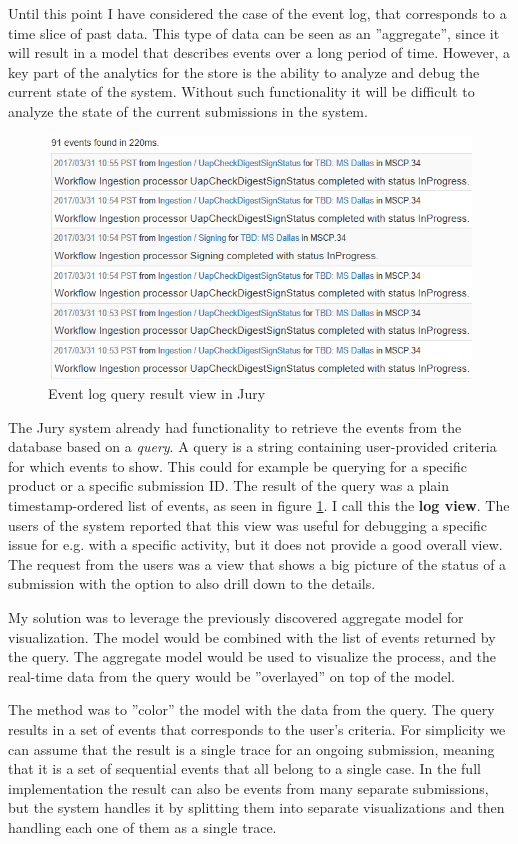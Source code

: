 \documentclass[english,12pt,a4paper,pdftex,sci,utf8]{aaltothesis}
\theoremstyle{definition}
\begin{document}
Until this point I have considered the case of the event log, that corresponds to a time slice of past data.
This type of data can be seen as an ''aggregate'', since it will result in a model that describes events over a long period of time.
However, a key part of the analytics for the store is the ability to analyze and debug the current state of the system.
Without such functionality it will be difficult to analyze the state of the current submissions in the system.

\begin{figure}[htb]
    \centering \includegraphics[width=0.7\linewidth]{gfx/plaineventlog.png}
    \caption{Event log query result view in Jury}
    \label{fig:plaineventlog}
\end{figure}

The Jury system already had functionality to retrieve the events from the database based on a \emph{query}.
A query is a string containing user-provided criteria for which events to show.
This could for example be querying for a specific product or a specific submission ID.
The result of the query was a plain timestamp-ordered list of events, as seen in figure \ref{fig:plaineventlog}.
I call this the \textbf{log view}.
The users of the system reported that this view was useful for debugging a specific issue for e.g. with a specific activity, but it does not provide a good overall view.
The request from the users was a view that shows a big picture of the status of a submission with the option to also drill down to the details.

My solution was to leverage the previously discovered aggregate model for visualization.
The model would be combined with the list of events returned by the query.
The aggregate model would be used to visualize the process, and the real-time data from the query would be ''overlayed'' on top of the model.

The method was to ''color'' the model with the data from the query.
The query results in a set of events that corresponds to the user's criteria.
For simplicity we can assume that the result is a single trace for an ongoing submission,
meaning that it is a set of sequential events that all belong to a single case.
In the full implementation the result can also be events from many separate submissions,
but the system handles it by splitting them into separate visualizations and then handling each one of them as a single trace.
\end{document}
